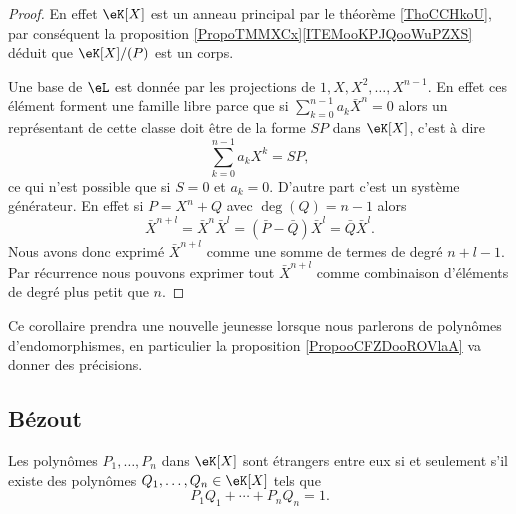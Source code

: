 \begin{proof}
    En effet \( \eK[X]\) est un anneau principal par le théorème \ref{ThoCCHkoU}, par conséquent la proposition \ref{PropoTMMXCx}\ref{ITEMooKPJQooWuPZXS} déduit que \( \eK[X]/(P)\) est un corps.

    Une base de \( \eL\) est donnée par les projections de \( 1,X,X^2,\ldots, X^{n-1}\). En effet ces élément forment une famille libre parce que si \( \sum_{k=0}^{n-1}a_k\bar X^n=0\) alors un représentant de cette classe doit être de la forme \( SP\) dans \( \eK[X]\), c'est à dire
    \begin{equation}
        \sum_{k=0}^{n-1}a_kX^k=SP,
    \end{equation}
    ce qui n'est possible que si \( S=0\) et \( a_k=0\). D'autre part c'est un système générateur. En effet si \( P=X^n+Q\) avec \( \deg(Q)=n-1\) alors
    \begin{equation}
        \bar X^{n+l}=\bar X^n\bar X^l=(\bar P-\bar Q)\bar X^l=\bar Q\bar X^l.
    \end{equation}
    Nous avons donc exprimé \( \bar X^{n+l}\) comme une somme de termes de degré \( n+l-1\). Par récurrence nous pouvons exprimer tout \( \bar X^{n+l}\) comme combinaison d'éléments de degré plus petit que \( n\).
\end{proof}

\begin{remark}
    Ce corollaire prendra une nouvelle jeunesse lorsque nous parlerons de polynômes d'endomorphismes, en particulier la proposition \ref{PropooCFZDooROVlaA} va donner des précisions.
\end{remark}

\subsection{Bézout}

\begin{theorem}[Bézout] \label{ThoBezoutOuGmLB}     
    Les polynômes \( P_1,\ldots,P_n\) dans \( \eK[X]\) sont étrangers entre eux si et seulement s'il existe des polynômes \( Q_1,\ldots,Q_n\in\eK[X]\) tels que
    \begin{equation}
        P_1Q_1+\cdots+P_nQ_n=1.
    \end{equation}
\end{theorem}

